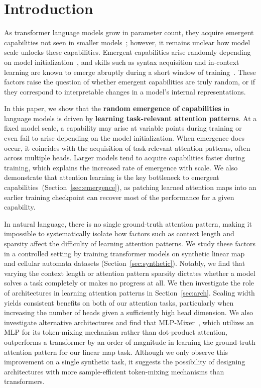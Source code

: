 \documentclass{article}
\newcommand{\xxcomment}[4]{}
\newcommand{\pavel}[1]{}
\newcommand{\xxcomment}[4]{\textcolor{#1}{[$^{\textsc{#2}}_{\textsc{#3}}$ #4]}}
\newcommand{\pavel}[1]{\xxcomment{pavelgreen}{P}{I}{#1}}
\begin{document}
\section{Introduction}
As transformer language models grow in parameter count, they acquire emergent capabilities not seen in smaller models~\citep{wei2022emergentabilitieslargelanguage}; however, it remains unclear how model scale unlocks these capabilities. Emergent capabilities arise randomly depending on model initialization~\citep{zhao2026randomscalingemergentcapabilities}, and skills such as syntax acquisition and in-context learning are known to emerge abruptly during a short window of training~\citep{chen2025suddendropslosssyntax, olsson2022incontextlearninginductionheads}. These factors raise the question of whether emergent capabilities are truly random, or if they correspond to interpretable changes in a model's internal representations.

In this paper, we show that the \textbf{random emergence of capabilities} in language models is driven by \textbf{learning task-relevant attention patterns}. At a fixed model scale, a capability may arise at variable points during training or even fail to arise depending on the model initialization. When emergence does occur, it coincides with the acquisition of task-relevant attention patterns, often across multiple heads. Larger models tend to acquire capabilities faster during training, which explains the increased rate of emergence with scale. We also demonstrate that attention learning is the key bottleneck to emergent capabilities~(Section~\ref{sec:emergence}), as patching learned attention maps into an earlier training checkpoint can recover most of the performance for a given capability.

In natural language, there is no single ground-truth attention pattern, making it impossible to systematically isolate how factors such as context length and sparsity affect the difficulty of learning attention patterns. We study these factors in a controlled setting by training transformer models on synthetic linear map and cellular automata datasets 
(Section~\ref{sec:synthetic}). Notably, we find that varying the context length or attention pattern sparsity dictates whether a model solves a task completely or makes no progress at all. We then investigate the role of architectures in learning attention patterns in Section~\ref{sec:arch}. Scaling width yields consistent benefits on both of our attention tasks, particularly when increasing the number of heads given a sufficiently high head dimension. We also investigate alternative architectures and find that MLP-Mixer~\citep{tolstikhin2021mlpmixerallmlparchitecturevision}, which utilizes an MLP for its token-mixing mechanism rather than dot-product attention, outperforms a transformer by an order of magnitude in learning the ground-truth attention pattern for our linear map task.
Although we only observe this improvement on a single synthetic task, it suggests the possibility of designing architectures with more sample-efficient token-mixing mechanisms than transformers. 
\end{document}

